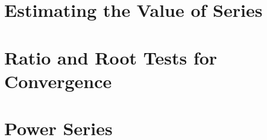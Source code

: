 \section{Estimating the Value of Series}

\section{Ratio and Root Tests for Convergence}

\section{Power Series}
